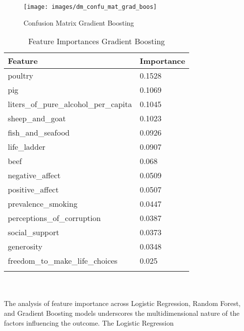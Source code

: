 			\begin{figure}[h!]
				\centering
				\texttt{[image: images/dm\_confu\_mat\_grad\_boos]}
				\caption{Confusion Matrix Gradient Boosting}
				\label{fig:grad_boos}
			\end{figure}
			\begin{table}[h!]
				\centering
				\caption{Feature Importances Gradient Boosting}
				\begin{tabularx}{0.8\textwidth}{lX}
					\toprule
					\textbf{Feature}                  & \textbf{Importance} \\
					\midrule
					poultry                                & 0.1528              \\
					pig                                    & 0.1069              \\
					liters\_of\_pure\_alcohol\_per\_capita & 0.1045              \\
					sheep\_and\_goat                       & 0.1023              \\
					fish\_and\_seafood                     & 0.0926              \\
					life\_ladder                           & 0.0907              \\
					beef                                   & 0.068               \\
					negative\_affect                       & 0.0509              \\
					positive\_affect                       & 0.0507              \\
					prevalence\_smoking                    & 0.0447              \\
					perceptions\_of\_corruption            & 0.0387              \\
					social\_support                        & 0.0373              \\
					generosity                             & 0.0348              \\
					freedom\_to\_make\_life\_choices       & 0.025               \\
					\bottomrule
					\label{table:fi_gradient}
				\end{tabularx}
			\end{table}
			\\
			\\
			The analysis of feature importance across Logistic Regression, Random Forest, and Gradient Boosting models
			underscores the multidimensional nature of the factors influencing the outcome. The Logistic Regression
